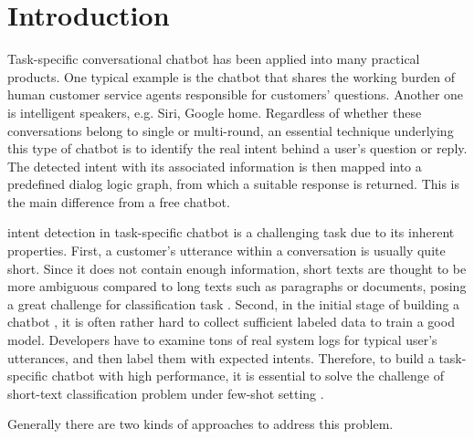 \section{Introduction}
\label{sec:intro}

Task-specific  conversational  chatbot  \cite{wen2016network}  has been applied
into  many practical products. One typical example is the chatbot that shares the working burden of
human  customer  service  agents  responsible  for  customers' questions. 
Another one is intelligent  speakers, e.g. Siri, Google home. 
Regardless of whether these conversations belong to
single or  multi-round, an essential technique underlying this type of chatbot is to
identify  the  real  intent  behind  a  user's  question or reply. 
The detected intent  with  its  associated  information  is then mapped into a
predefined dialog logic graph, from which a suitable response is returned.
This  is  the  main  difference  from  a  free chatbot.  

intent detection in task-specific chatbot  is  a  challenging task due to its inherent properties. First,
a customer's  utterance  within  a conversation is usually quite short. Since it
does  not  contain  enough  information,  short  texts \cite{song2014short} are
thought  to  be  more  ambiguous  compared to long texts such as paragraphs or
documents,  posing  a  great challenge \cite{chen2019deep} for classification
task   \cite{phan2008learning,yan2009dynamic,hua2015short}.   Second,  in  the
initial  stage  of  building  a  chatbot , it is often rather hard to collect
sufficient  labeled  data  to  train  a good model. Developers have to
examine tons of real system logs for typical user's utterances, and then label
them  with expected intents. Therefore, to build a task-specific chatbot with
high  performance, it is essential to solve the challenge of short-text
classification   \cite{sriram2010short}   problem   under   few-shot   setting
\cite{yu2018diverse}.


Generally  there  are  two  kinds  of  approaches  to  address  this  problem.


